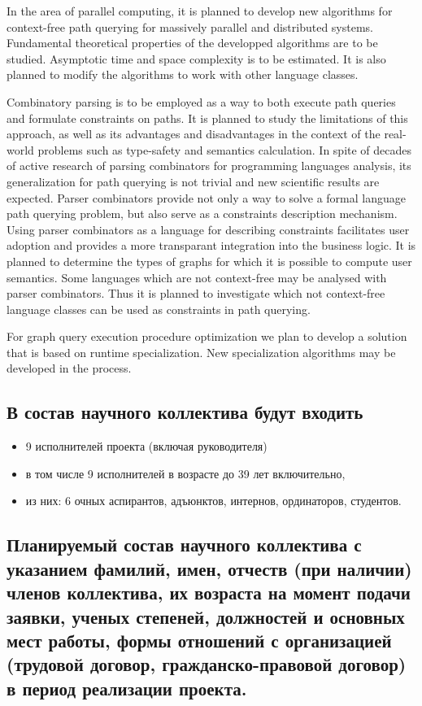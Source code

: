 \documentclass[12pt]{article}  %
\theoremstyle{remark}
\begin{document}
In the area of parallel computing, it is planned to develop new algorithms for context-free path querying for massively parallel and distributed systems. Fundamental theoretical properties of the developped algorithms are to be studied. Asymptotic time and space complexity is to be estimated. It is also planned to modify the algorithms to work with other language classes.

Combinatory parsing is to be employed as a way to both execute path queries and formulate constraints on paths. It is planned to study the limitations of this approach, as well as its advantages and disadvantages in the context of the real-world problems such as type-safety and semantics calculation. In spite of decades of active research of parsing combinators for programming languages analysis, its generalization for path querying is not trivial and new scientific results are expected. Parser combinators provide not only a way to solve a formal language path querying problem, but also serve as a constraints description mechanism. Using parser combinators as a language for describing constraints facilitates user adoption and provides a more transparant integration into the business logic. It is planned to determine the types of graphs for which it is possible to compute user semantics. Some languages which are not context-free may be analysed with parser combinators. Thus it is planned to investigate which not context-free language classes can be used as constraints in path querying.

For graph query execution procedure optimization we plan to develop a solution that is based on runtime specialization. New specialization algorithms may be developed in the process.

\subsection{В состав научного коллектива будут входить}
%
\begin{itemize}
\item 9 исполнителей проекта (включая руководителя)
\item в том числе 9  исполнителей в возрасте до 39 лет включительно,
\item из них: 6 очных аспирантов, адъюнктов, интернов, ординаторов, студентов.
\end{itemize}

\subsection{Планируемый состав научного коллектива с указанием фамилий, имен, отчеств (при наличии) членов коллектива, их возраста на момент подачи заявки, ученых степеней, должностей и основных мест работы, формы отношений с организацией (трудовой договор, гражданско-правовой договор) в период реализации проекта.}
\end{document}
